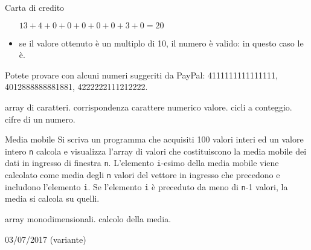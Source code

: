 \begin{exrev}{Carta di credito}
\begin{itemize}
$13 + 4 + 0 + 0 + 0 + 0 + 0 + 3 + 0 = 20$

\item se il valore ottenuto \`e un multiplo di 10, il numero \`e valido: in questo caso le \`e.
\end{itemize}

Potete provare con alcuni numeri suggeriti da PayPal: 4111111111111111, 4012888888881881, 4222222111212222.

\begin{tags}
array di caratteri. corrispondenza carattere numerico valore. cicli a conteggio. cifre di un numero.
\end{tags}

\end{exrev}

\begin{exrev}{Media mobile}
Si scriva un programma che acquisiti 100 valori interi ed un valore intero \texttt{n} calcola e visualizza l'array di valori che costituiscono la media mobile dei dati in ingresso di finestra \texttt{n}. L'elemento \texttt{i}-esimo della media mobile viene calcolato come media degli \texttt{n} valori del vettore in ingresso che precedono e includono l'elemento \texttt{i}. Se l'elemento \texttt{i} \`e preceduto da meno di \texttt{n}-1 valori, la media si calcola su quelli.


\begin{tags}
array monodimensionali. calcolo della media.
\end{tags}

\begin{esame}
03/07/2017 (variante)
\end{esame}


\end{exrev}

